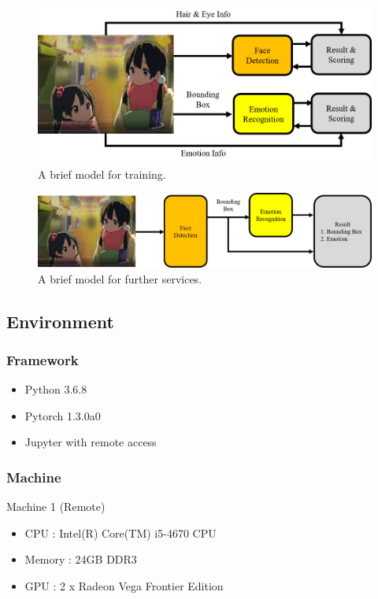 \documentclass{article}
\begin{document}
\begin{figure}[ht]
\vskip 0.2in
\begin{center}
\centerline{\includegraphics[width=\columnwidth]{training.png}}
\caption{A brief model for training.}
\label{icml-historical}
\end{center}
\vskip -0.2in
\end{figure}

\begin{figure}[ht]
\vskip 0.2in
\begin{center}
\centerline{\includegraphics[width=\columnwidth]{service.png}}
\caption{A brief model for further services.}
\label{icml-historical}
\end{center}
\vskip -0.2in
\end{figure}

\subsection{Environment}
\subsubsection{Framework}
\begin{itemize}
\item Python 3.6.8
\item Pytorch 1.3.0a0
\item Jupyter with remote access
\end{itemize}

\subsubsection{Machine}
Machine 1 (Remote)
\begin{itemize}
\item CPU : Intel(R) Core(TM) i5-4670 CPU
\item Memory : 24GB DDR3
\item GPU : 2 x Radeon Vega Frontier Edition
\end{itemize}
\end{document}
